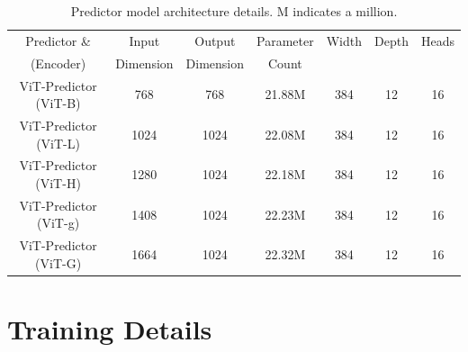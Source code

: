 \documentclass{applemlr}
\numberwithin{equation}{section}
\begin{document}
\begin{table}[htbp]
    \centering
    \caption{Predictor model architecture details. M indicates a million.}
    \label{tab:appendix:model_arch:predictors}

    \begin{tabular}{ccccccc}
        \toprule
        Predictor \& & Input & Output & Parameter & Width & 
        Depth & Heads \\
        (Encoder) & Dimension & Dimension & Count & & & \\
        \midrule
        ViT-Predictor (ViT-B) &  768 & 768  & 21.88M    & 384 & 12 & 16 \\
        ViT-Predictor (ViT-L) & 1024 & 1024 & 22.08M & 384 & 12 & 16 \\
        ViT-Predictor (ViT-H) & 1280 & 1024 & 22.18M & 384 & 12 & 16 \\
        ViT-Predictor (ViT-g) & 1408 & 1024 & 22.23M & 384 & 12 & 16 \\
        ViT-Predictor (ViT-G) & 1664 & 1024 & 22.32M       & 384 & 12 & 16 \\
        
    \end{tabular}
\end{table}



\section{Training Details}
\label{appendix:sec:training_details}
\end{document}
